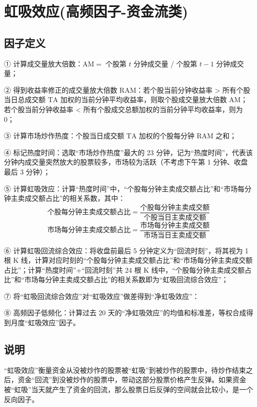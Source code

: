 \documentclass{article}
\begin{document}
\section{虹吸效应(高频因子-资金流类)}

\subsection{因子定义}

① 计算成交量放大倍数：\( \mathrm{AM} = \) 个股第 \( t \) 分钟成交量 / 个股第 \( t-1 \) 分钟成交量；

② 得到收益率修正的成交量放大倍数 \( \mathrm{RAM} \)：若个股当前分钟收益率 > 所有个股当日总成交额 \( \mathrm{TA} \) 加权的当前分钟平均收益率，则取个股成交量放大倍数 \( \mathrm{AM} \)；若个股当前分钟收益率 < 所有个股成交总额加权的当前分钟平均收益率，则为 0；

③ 计算市场炒作热度：个股当日成交额 \( \mathrm{TA} \) 加权的个股每分钟 \( \mathrm{RAM} \) 之和；

④ 标记热度时间：选取“市场炒作热度”最大的 23 分钟，记为“热度时间”，代表该分钟内成交量突然放大的股票较多，市场较为活跃（不考虑下午第 1 分钟、收盘最后 3 分钟）；

⑤ 计算虹吸效应：计算“热度时间”中，“个股每分钟主卖成交额占比”和“市场每分钟主卖成交额占比”的相关系数，其中：
    \begin{equation*}
        \text{个股每分钟主卖成交额占比} = \frac{\text{个股每分钟主卖成交额}}{\text{个股当日主卖成交额}}
    \end{equation*}
    \begin{equation*}
        \text{市场每分钟主卖成交额占比} = \frac{\text{市场每分钟主卖成交额}}{\text{市场当日主卖成交额}}
    \end{equation*}

⑥ 计算虹吸回流综合效应：将收盘前最后 5 分钟定义为“回流时刻”，将其视为 1 根 K 线，计算对应时刻的“个股每分钟主卖成交额占比”和“市场每分钟主卖成交额占比”；计算“热度时间”+“回流时刻”共 24 根 K 线中，“个股每分钟主卖成交额占比”和“市场每分钟主卖成交额占比”的相关系数即为“虹吸回流综合效应”；

⑦ 将“虹吸回流综合效应”对“虹吸效应”做差得到“净虹吸效应”：

⑧ 高频因子低频化：计算过去 20 天的“净虹吸效应”的均值和标准差，等权合成得到月度“虹吸效应”因子。

\subsection{说明}
“虹吸效应”衡量资金从没被炒作的股票被“虹吸”到被炒作的股票中，待炒作结束之后，资金“回流”到没被炒作的股票中，带动这部分股票价格产生反弹。如果资金被“虹吸”当天就产生了资金的回流，那么股票日后反弹的空间就会比较小，是一个反向因子。
\end{document}
